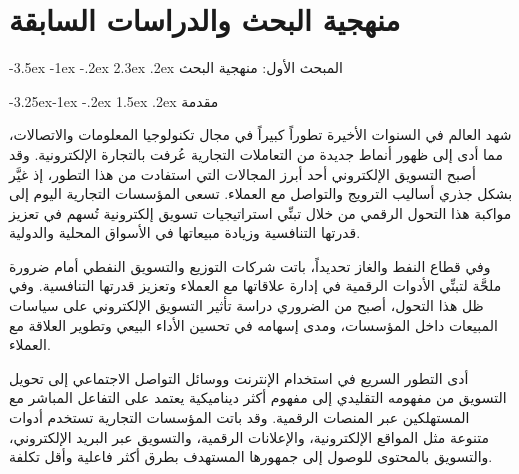 \documentclass[12pt, a4paper]{report}
\makeatletter
\newif\ifdrawborder
\renewcommand\section{\@startsection{section}{1}{\z@}%
  {-3.5ex \@plus -1ex \@minus -.2ex}%
  {2.3ex \@plus .2ex}%
  {\normalfont\Large\bfseries\color{primaryblue}}}
\renewcommand\subsection{\@startsection{subsection}{2}{\z@}%
  {-3.25ex\@plus -1ex \@minus -.2ex}%
  {1.5ex \@plus .2ex}%
  {\normalfont\large\bfseries\color{sectiongray}}}
\makeatother
\begin{document}
\newpage
\tableofcontents
\newpage
\listoftables

\newpage
{}
\pagestyle{fancy}
\drawbordertrue

\chapter{منهجية البحث والدراسات السابقة}

\section{المبحث الأول: منهجية البحث}

\subsection{مقدمة}

شهد العالم في السنوات الأخيرة تطوراً كبيراً في مجال تكنولوجيا المعلومات والاتصالات، مما أدى إلى ظهور أنماط جديدة من التعاملات التجارية عُرفت بالتجارة الإلكترونية. وقد أصبح التسويق الإلكتروني أحد أبرز المجالات التي استفادت من هذا التطور، إذ غيَّر بشكل جذري أساليب الترويج والتواصل مع العملاء. تسعى المؤسسات التجارية اليوم إلى مواكبة هذا التحول الرقمي من خلال تبنِّي استراتيجيات تسويق إلكترونية تُسهم في تعزيز قدرتها التنافسية وزيادة مبيعاتها في الأسواق المحلية والدولية.

وفي قطاع النفط والغاز تحديداً، باتت شركات التوزيع والتسويق النفطي أمام ضرورة ملحَّة لتبنِّي الأدوات الرقمية في إدارة علاقاتها مع العملاء وتعزيز قدرتها التنافسية. وفي ظل هذا التحول، أصبح من الضروري دراسة تأثير التسويق الإلكتروني على سياسات المبيعات داخل المؤسسات، ومدى إسهامه في تحسين الأداء البيعي وتطوير العلاقة مع العملاء.

أدى التطور السريع في استخدام الإنترنت ووسائل التواصل الاجتماعي إلى تحويل التسويق من مفهومه التقليدي إلى مفهوم أكثر ديناميكية يعتمد على التفاعل المباشر مع المستهلكين عبر المنصات الرقمية. وقد باتت المؤسسات التجارية تستخدم أدوات متنوعة مثل المواقع الإلكترونية، والإعلانات الرقمية، والتسويق عبر البريد الإلكتروني، والتسويق بالمحتوى للوصول إلى جمهورها المستهدف بطرق أكثر فاعلية وأقل تكلفة.
\end{document}
